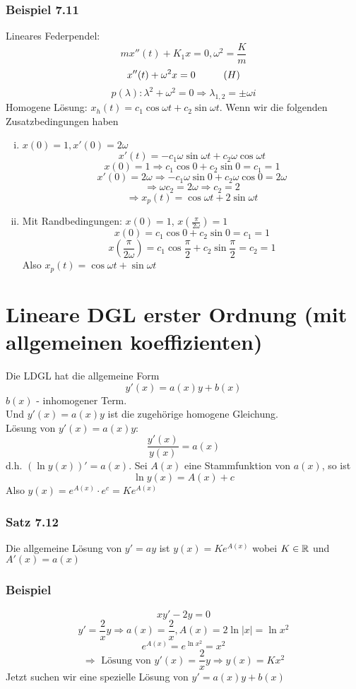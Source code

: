 \subsubsection*{Beispiel 7.11}
Lineares Federpendel:
\[mx''(t)+K_1x=0, \omega^2=\frac{K}{m}\]
\[x''(t)+\omega^2x=0\hspace{10mm}(H)\]
\[p(\lambda):\lambda^2+\omega^2=0\Rightarrow\lambda_{1,2}=\pm\omega i\]
Homogene Lösung: $x_h(t)=c_1\cos\omega t+c_2\sin\omega t$.
Wenn wir die folgenden Zusatzbedingungen haben
\begin{enumerate}[(i)]
\item $x(0)=1, x'(0)=2\omega$
\[x'(t)=-c_1\omega\sin\omega t+c_2\omega\cos\omega t\]
\[x(0)=1\Rightarrow c_1\cos 0+c_2\sin 0=c_1=1\]
\[x'(0)=2\omega\Rightarrow-c_1\omega\sin 0+c_2\omega\cos 0=2\omega\]
\[\Rightarrow \omega c_2=2\omega\Rightarrow c_2=2\]
\[\Rightarrow x_p(t)=\cos\omega t+2\sin\omega t\]
\item Mit Randbedingungen: $x(0)=1$, $x\left(\frac{\pi}{2\omega}\right)=1$
\[x(0)=c_1\cos 0+c_2\sin 0=c_1=1\]
\[x\left(\frac{\pi}{2\omega}\right)=c_1\cos\frac{\pi}{2}+c_2\sin\frac{\pi}{2}=c_2=1\]
Also $x_p(t)=\cos\omega t+\sin\omega t$
\end{enumerate}

\section{Lineare DGL erster Ordnung (mit allgemeinen koeffizienten)}
Die LDGL hat die allgemeine Form \[y'(x)=a(x)y+b(x)\] $b(x)$ - inhomogener Term.\\

\noindent Und $y'(x)=a(x)y$ ist die zugehörige homogene Gleichung. \\

\noindent Lösung von $y'(x)=a(x)y$: \[\frac{y'(x)}{y(x)}=a(x)\]
d.h. $\left( \ln y(x)\right)'=a(x)$. Sei $A(x)$ eine Stammfunktion von $a(x)$, so ist \[\ln y(x)=A(x)+c\] Also $y(x)=e^{A(x)}\cdot e^c=Ke^{A(x)}$
\subsubsection*{Satz 7.12}
Die allgemeine Lösung von $y'=ay$ ist $y(x)=Ke^{A(x)}$ wobei $K\in\mathbb{R}$ und $A'(x)=a(x)$
\subsubsection*{Beispiel}
\[xy'-2y=0\]
\[y'=\frac{2}{x}y\Rightarrow a(x)=\frac{2}{x}, A(x)=2\ln\left|x\right|=\ln x^2\]
\[e^{A(x)}=e^{\ln x^2}=x^2\]
\[\Rightarrow\text{ Lösung von }y'(x)=\frac{2}{x}y \Rightarrow y(x)=Kx^2\]
Jetzt suchen wir eine spezielle Lösung von $y'=a(x)y+b(x)$
